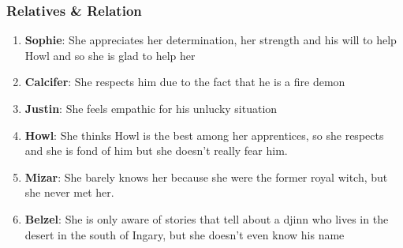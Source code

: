 




\subsubsection*{Relatives \& Relation}
\begin{enumerate}
\item \textbf{Sophie}: She appreciates her determination, her strength and his will to help Howl and so she is glad to help her
\item \textbf{Calcifer}: She respects him due to the fact that he is a fire demon
\item \textbf{Justin}: She feels empathic for his unlucky situation
\item \textbf{Howl}: She thinks Howl is the best among her apprentices, so she respects and she is fond of him but she doesn't really  fear him.
\item \textbf{Mizar}: She barely knows her because she were the former royal witch, but she never met her.
\item \textbf{Belzel}: She is only aware of stories that tell about a djinn who lives in the desert in the south of Ingary, but she doesn't even know his name
\end{enumerate}

